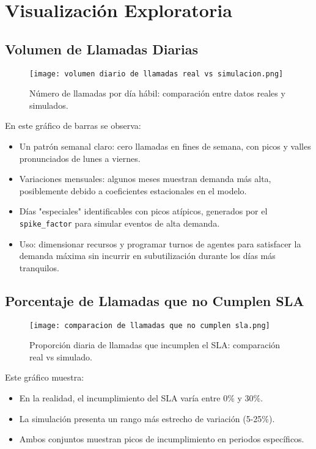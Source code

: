 \documentclass[12pt]{article}
\begin{document}
\newpage
\section{Visualización Exploratoria}

\subsection{Volumen de Llamadas Diarias}
\begin{figure}[H]
  \centering
  \texttt{[image: volumen diario de llamadas real vs simulacion.png]}
  \caption{Número de llamadas por día hábil: comparación entre datos reales y simulados.}
\end{figure}
\noindent
En este gráfico de barras se observa:
\begin{itemize}
  \item Un patrón semanal claro: cero llamadas en fines de semana, con picos y valles pronunciados de lunes a viernes.
  \item Variaciones mensuales: algunos meses muestran demanda más alta, posiblemente debido a coeficientes estacionales en el modelo.
  \item Días "especiales" identificables con picos atípicos, generados por el \texttt{spike\_factor} para simular eventos de alta demanda.
  \item Uso: dimensionar recursos y programar turnos de agentes para satisfacer la demanda máxima sin incurrir en subutilización durante los días más tranquilos.
\end{itemize}

\subsection{Porcentaje de Llamadas que no Cumplen SLA}
\begin{figure}[H]
  \centering
  \texttt{[image: comparacion de llamadas que no cumplen sla.png]}
  \caption{Proporción diaria de llamadas que incumplen el SLA: comparación real vs simulado.}
\end{figure}
\noindent
Este gráfico muestra:
\begin{itemize}
  \item En la realidad, el incumplimiento del SLA varía entre 0\% y 30\%.
  \item La simulación presenta un rango más estrecho de variación (5-25\%).
  \item Ambos conjuntos muestran picos de incumplimiento en periodos específicos.
\end{itemize}
\end{document}
